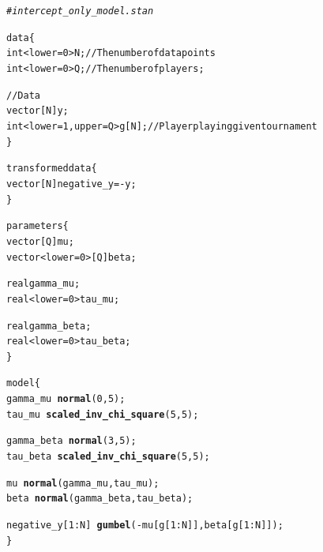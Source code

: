 \documentclass{article}\usepackage[]{graphicx}\usepackage[]{color}
\makeatletter
\newcommand{\hlcom}[1]{\textcolor[rgb]{0.678,0.584,0.686}{\textit{#1}}}%
\newcommand{\hlkwd}[1]{\textcolor[rgb]{0.737,0.353,0.396}{\textbf{#1}}}%
\newenvironment{kframe}{%
 \def\at@end@of@kframe{}%
 \ifinner\ifhmode%
  \def\at@end@of@kframe{\end{minipage}}%
  \begin{minipage}{\columnwidth}%
 \fi\fi%
 \def\FrameCommand##1{\hskip\@totalleftmargin \hskip-\fboxsep
 \colorbox{shadecolor}{##1}\hskip-\fboxsep
     \hskip-\linewidth \hskip-\@totalleftmargin \hskip\columnwidth}%
 \MakeFramed {\advance\hsize-\width
   \@totalleftmargin\z@ \linewidth\hsize
   \@setminipage}}%
 {\par\unskip\endMakeFramed%
 \at@end@of@kframe}
\newenvironment{knitrout}{}{} %
\makeatother
\begin{document}
\begin{knitrout}
\color{fgcolor}\begin{kframe}
\begin{alltt}
\hlcom{# intercept_only_model.stan}

data \{
  int<lower=0> N; // The number of data points
  int<lower=0> Q; // The number of players;
  
  //Data 
  vector[N] y;
  int<lower=1, upper=Q> g[N]; // Player playing given tournament
\}

transformed data \{
  vector[N] negative_y = -y;
\}

parameters \{
  vector[Q] mu;
  vector<lower=0>[Q] beta;
  
  real gamma_mu;
  real<lower=0> tau_mu;
  
  real gamma_beta;
  real<lower=0> tau_beta;
\}

model \{
  gamma_mu ~ \hlkwd{normal}(0, 5);
  tau_mu ~ \hlkwd{scaled_inv_chi_square}(5, 5);
  
  gamma_beta ~ \hlkwd{normal}(3,5);
  tau_beta ~ \hlkwd{scaled_inv_chi_square}(5,5);
  
  mu ~ \hlkwd{normal}(gamma_mu, tau_mu);
  beta ~ \hlkwd{normal}(gamma_beta, tau_beta);
  
  negative_y[1:N] ~ \hlkwd{gumbel}(-mu[g[1:N]], beta[g[1:N]]);
\}
\end{alltt}
\end{kframe}
\end{knitrout}
\end{document}
